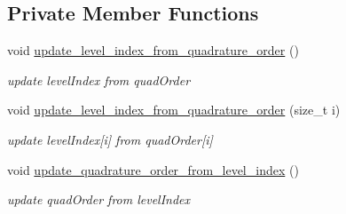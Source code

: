 \subsection*{Private Member Functions}
\begin{DoxyCompactItemize}
\item 
void \hyperlink{classPecos_1_1TensorProductDriver_ac50e52df0cd872831c6756fa6d91cc80}{update\+\_\+level\+\_\+index\+\_\+from\+\_\+quadrature\+\_\+order} ()\label{classPecos_1_1TensorProductDriver_ac50e52df0cd872831c6756fa6d91cc80}

\begin{DoxyCompactList}\small\item\em update level\+Index from quad\+Order \end{DoxyCompactList}\item 
void \hyperlink{classPecos_1_1TensorProductDriver_a441a44b433195913485084e4ca6a8f4d}{update\+\_\+level\+\_\+index\+\_\+from\+\_\+quadrature\+\_\+order} (size\+\_\+t i)\label{classPecos_1_1TensorProductDriver_a441a44b433195913485084e4ca6a8f4d}

\begin{DoxyCompactList}\small\item\em update level\+Index\mbox{[}i\mbox{]} from quad\+Order\mbox{[}i\mbox{]} \end{DoxyCompactList}\item 
void \hyperlink{classPecos_1_1TensorProductDriver_a5fb141cbec4e110a97022e728af4c0e8}{update\+\_\+quadrature\+\_\+order\+\_\+from\+\_\+level\+\_\+index} ()\label{classPecos_1_1TensorProductDriver_a5fb141cbec4e110a97022e728af4c0e8}

\begin{DoxyCompactList}\small\item\em update quad\+Order from level\+Index \end{DoxyCompactList}\end{DoxyCompactItemize}
